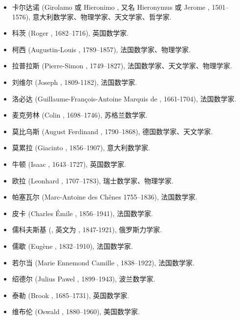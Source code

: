 \begin{itemize}
  \item 卡尔达诺 (Girolamo 或 Hieronimo , 又名 Hieronymus  或 Jerome , 1501--1576), 意大利数学家、物理学家、天文学家、哲学家.
  \item 科茨 (Roger , 1682--1716), 英国数学家.
  \item 柯西 (Augustin-Louis , 1789--1857), 法国数学家、物理学家.
  \item 拉普拉斯 (Pierre-Simon , 1749--1827), 法国数学家、天文学家、物理学家.
  \item 刘维尔 (Joseph , 1809-1182), 法国数学家.
  \item 洛必达 (Guillaume-François-Antoine Marquis de , 1661-1704), 法国数学家.
  \item 麦克劳林 (Colin , 1698--1746), 苏格兰数学家.
  \item 莫比乌斯 (August Ferdinand , 1790--1868), 德国数学家、天文学家.
  \item 莫累拉 (Giacinto , 1856--1907), 意大利数学家.
  \item 牛顿 (Isaac , 1643--1727), 英国数学家.
  \item 欧拉 (Leonhard , 1707--1783), 瑞士数学家、物理学家.
  \item 帕塞瓦尔 (Marc-Antoine  des Chênes 1755--1836), 法国数学家.
  \item 皮卡 (Charles Émile , 1856--1941), 法国数学家.
  \item 儒科夫斯基 (, 英文为 , 1847-1921), 俄罗斯力学家.
  \item 儒歇 (Eugène , 1832--1910), 法国数学家.
  \item 若尔当 (Marie Ennemond Camille , 1838--1922), 法国数学家.
  \item 绍德尔 (Julius Pawel , 1899--1943), 波兰数学家.
  \item 泰勒 (Brook , 1685--1731), 英国数学家.
  \item 维布伦 (Oswald , 1880--1960), 美国数学家.
\end{itemize}
